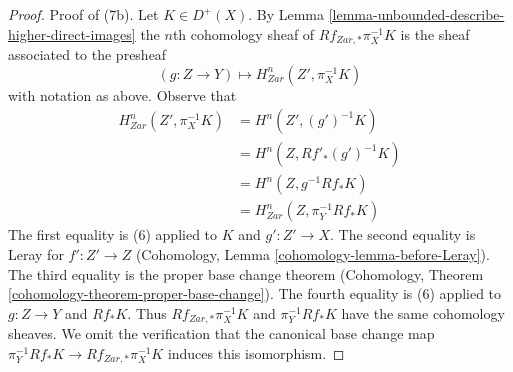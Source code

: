 \documentclass[10pt,a4paper]{amsart}
\theoremstyle{plain}
\theoremstyle{definition}
\theoremstyle{remark}
\numberwithin{equation}{subsection}
\begin{document}
\begin{proof}
\medskip\noindent
Proof of (7b). Let $K \in D^+(X)$. By
Lemma \ref{lemma-unbounded-describe-higher-direct-images}
the $n$th cohomology sheaf of
$Rf_{Zar, *}\pi_X^{-1}K$ is the sheaf associated to the presheaf
$$
(g : Z \to Y) \longmapsto H^n_{Zar}(Z', \pi_X^{-1}K)
$$
with notation as above. Observe that
\begin{align*}
H^n_{Zar}(Z', \pi_X^{-1}K)
& =
H^n(Z', (g')^{-1}K) \\
& =
H^n(Z, Rf'_*(g')^{-1}K) \\
& =
H^n(Z, g^{-1}Rf_*K) \\
& =
H^n_{Zar}(Z, \pi_Y^{-1}Rf_*K)
\end{align*}
The first equality is (6) applied to $K$ and $g' : Z' \to X$.
The second equality is Leray for $f' : Z' \to Z$
(Cohomology, Lemma \ref{cohomology-lemma-before-Leray}).
The third equality is the proper base change theorem
(Cohomology, Theorem \ref{cohomology-theorem-proper-base-change}).
The fourth equality is (6) applied to $g : Z \to Y$ and $Rf_*K$.
Thus $Rf_{Zar, *}\pi_X^{-1}K$ and $\pi_Y^{-1}Rf_*K$ have the same
cohomology sheaves. We omit the verification that the
canonical base change map $\pi_Y^{-1}Rf_*K \to Rf_{Zar, *}\pi_X^{-1}K$
induces this isomorphism.
\end{proof}
\end{document}

